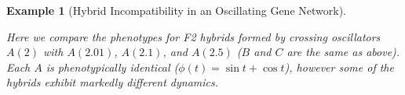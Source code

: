 \documentclass{article}
\newcommand{\1}{\mathbbm{1}}
\newtheorem{example}{Example}
\begin{document}
  \begin{example}[Hybrid Incompatibility in an Oscillating Gene Network] \label{ex:hybrid_osc}

Here we compare the phenotypes for F2 hybrids formed by crossing oscillators $A(2)$ with $A(2.01)$, $A(2.1)$, and $A(2.5)$ ($B$ and $C$ are the same as above). 
Each $A$ is phenotypically identical ($\phi(t) = \sin t + \cos t$), however some of the hybrids exhibit markedly different dynamics. 




\end{example}
\end{document}
